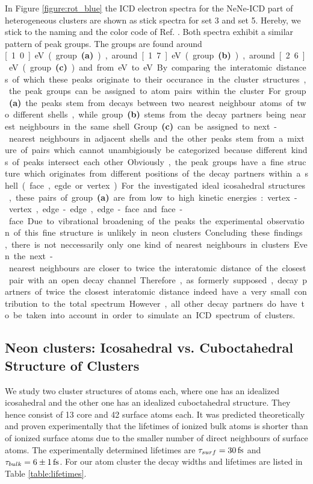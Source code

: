 In Figure \ref{figure:rot_blue} the ICD electron spectra for the NeNe-ICD
part of heterogeneous clusters are shown as stick spectra
for set 3 and set 5. Hereby, we stick to the naming and the color code of
Ref. \cite{Fasshauer14_1}. Both spectra exhibit a similar pattern of peak groups.
The groups are found around \unit[1.0]{eV} (group \textbf{(a)}),
around \unit[1.7]{eV} (group \textbf{(b)}), around \unit[2.6]{eV}
(group \textbf{(c)})
and from \unit[3]{eV} to \unit[4]{eV}. By comparing
the interatomic distances of which these peaks originate to their occurance
in the cluster structures, the peak groups can be assigned to atom pairs
within the cluster. For group \textbf{(a)} the peaks stem from decays
between two nearest neighbour atoms of two different shells,
while group \textbf{(b)}
stems from the decay partners being nearest neighbours in the same shell.
Group \textbf{(c)} can be assigned to next-nearest neighbours in adjacent shells
and the other peaks stem from a mixture of pairs which cannot unambigiously
be categorized because different kinds of peaks intersect each other.

Obviously, the peak groups have a fine structure which originates from
different positions of the decay partners within a shell (face, egde or vertex).
For the investigated ideal icosahedral structures,
these pairs of group \textbf{(a)}
are from low to high kinetic energies: vertex-vertex, edge-edge, edge-face and
face-face. Due to vibrational broadening of the peaks the experimental observation
of this fine structure is unlikely in neon clusters.

Concluding these findings, there is not neccessarily only one kind of nearest
neighbours in clusters. Even the next-nearest neighbours are closer to
twice the interatomic distance of the closest pair with an open decay channel.
Therefore, as formerly supposed, decay partners of twice the closest interatomic
distance indeed have a very small contribution to the total spectrum. However,
all other decay partners do have to be taken into account in order to simulate
an ICD spectrum of clusters.


\subsection{Neon clusters: Icosahedral vs. Cuboctahedral Structure of Clusters}
\label{sec:icofcc}
We study two cluster structures of \unit[55]{atoms} each, where one has an
idealized icosahedral and the other one has an idealized cuboctahedral structure.
They hence consist of 13 core and 42 surface atoms each. It was predicted
theoretically and proven experimentally that the lifetimes of ionized bulk atoms
is shorter than of ionized surface atoms due to the smaller number of direct
neighbours of surface atoms. The experimentally determined lifetimes are
$\tau_{surf} = \unit[30]{fs}$ and $\tau_{bulk} = \unit[6\pm 1]{fs}$.
For our \unit[55]{atom} cluster the decay widths and lifetimes are listed in
Table \ref{table:lifetimes}.


